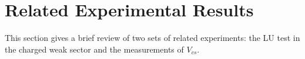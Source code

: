 







% 



\section{Related Experimental Results}

This section gives a brief review of two sets of related experiments: the LU test in the charged weak sector and the measurements of $V_{cs}$.

